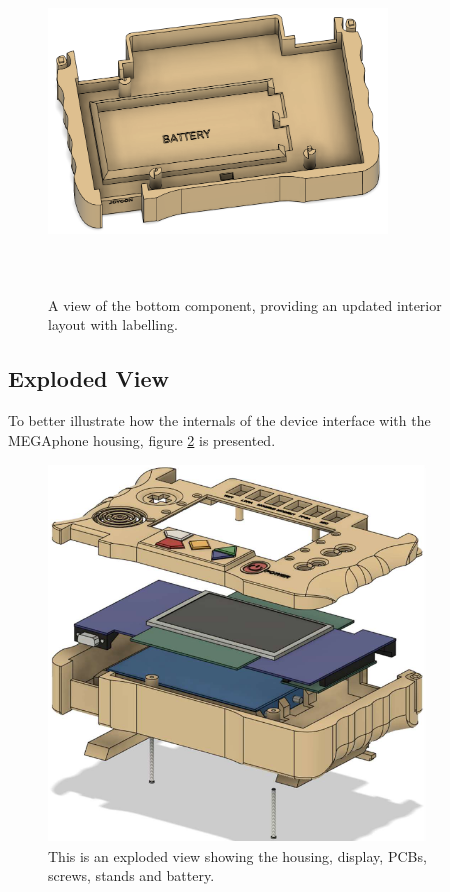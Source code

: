 \begin{figure} [h]
    \centering
    \includegraphics[width=9cm,height=9cm,keepaspectratio]{Figures/iteration4_bottom_front.png}
    \caption{A view of the bottom component, providing an updated interior layout with labelling.}
    \label{fig:iteration4_b_f}
\end{figure}

\subsection{Exploded View}

To better illustrate how the internals of the device interface with the MEGAphone housing, figure \ref{fig:Exploded} is presented.

\begin{figure} [h]
    \centering
    \includegraphics[width=10cm,height=10cm,keepaspectratio]{Figures/exploded_view.png}
    \caption{This is an exploded view showing the housing, display, PCBs, screws, stands and battery.}
    \label{fig:Exploded}
\end{figure}

